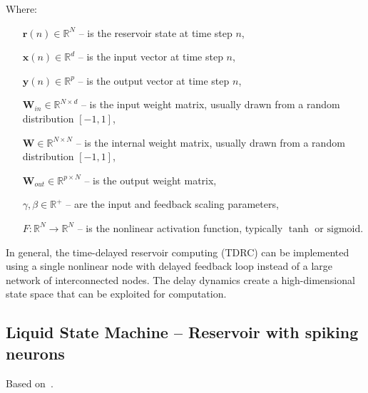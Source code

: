 \documentclass[11pt, oneside]{article}
\begin{document}
Where:
\begin{itemize}[noitemsep, leftmargin=4cm, label={}]
    \item [\(\mathbf{r}(n) \in \mathbb{R}^N\)] -- is the reservoir state at time step \(n\),
    \item [\(\mathbf{x}(n) \in \mathbb{R}^d\)] -- is the input vector at time step \(n\),
    \item [\(\mathbf{y}(n) \in \mathbb{R}^p\)] -- is the output vector at time step \(n\),
    \item [\(\mathbf{W}_{in} \in \mathbb{R}^{N \times d}\)] -- is the input weight matrix, usually drawn from a random distribution \([-1, 1]\),
    \item [\(\mathbf{W} \in \mathbb{R}^{N \times N}\)] -- is the internal weight matrix, usually drawn from a random distribution \([-1, 1]\),
    \item [\(\mathbf{W}_{out} \in \mathbb{R}^{p \times N}\)] -- is the output weight matrix,
    \item [\(\gamma, \beta \in \mathbb{R}^+\)] -- are the input and feedback scaling parameters,
    \item [\(F: \mathbb{R}^N \to \mathbb{R}^N\)] -- is  the nonlinear activation function, typically \(\tanh\) or \(\mathrm{sigmoid}\).
\end{itemize}


In general, the time-delayed reservoir computing (TDRC) can be implemented using a single nonlinear node with delayed feedback loop instead of a large network of interconnected nodes. The delay dynamics create a high-dimensional state space that can be exploited for computation.
\subsection{Liquid State Machine -- Reservoir with spiking neurons}
Based on~\autocite{Maass2011, Deckers2022}.
\end{document}
